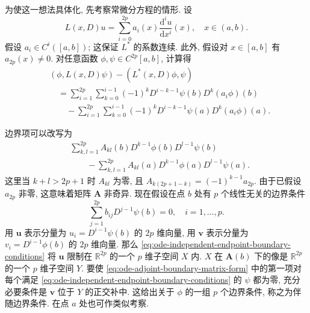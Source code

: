 为使这一想法具体化, 先考察常微分方程的情形. 设
\begin{equation}\label{eq:even-order-ordinary-differential-operator}
L(x,D)u=\sum_{i=0}^{2p}a_i(x)\dfrac{\mathrm{d}^iu}{\mathrm{d}x^i}(x),\quad x\in(a,b).
\end{equation}
假设 $a_i\in C^i([a,b])$; 这保证 $L^*$ 的系数连续. 此外, 假设对 $x\in[a,b]$ 有 $a_{2p}(x)\ne0$. 对任意函数 $\phi,\psi\in C^{2p}[a,b]$, 计算得
\begin{equation}\label{eq:ode-formal-adjoint-boundary-expansion}
\begin{aligned}
&(\phi,L(x,D)\psi)-(L^*(x,D)\phi,\psi)\\
&\quad=\sum_{i=1}^{2p}\sum_{k=0}^{i-1}(-1)^kD^{i-k-1}\psi(b)D^k(a_i\phi)(b)\\
&\qquad-\sum_{i=1}^{2p}\sum_{k=0}^{i-1}(-1)^kD^{i-k-1}\psi(a)D^k(a_i\phi)(a).
\end{aligned}
\end{equation}


边界项可以改写为
\begin{equation}\label{eq:ode-adjoint-boundary-matrix-form}
\begin{aligned}
&\sum_{k,l=1}^{2p}A_{kl}(b)D^{k-1}\phi(b)D^{l-1}\psi(b)\\
&\qquad-\sum_{k,l=1}^{2p}A_{kl}(a)D^{k-1}\phi(a)D^{l-1}\psi(a).
\end{aligned}
\end{equation}
这里当 $k+l>2p+1$ 时 $A_{kl}$ 为零, 且 $A_{k(2p+1-k)}=(-1)^{k-1}a_{2p}$. 由于已假设 $a_{2p}$ 非零, 这意味着矩阵 $\bm{A}$ 非奇异. 现在假设在点 $b$ 处有 $p$ 个线性无关的边界条件
\begin{equation}\label{eq:ode-independent-endpoint-boundary-conditions}
\sum_{j=1}^{2p}b_{ij}D^{j-1}\psi(b)=0,\quad i=1,\ldots,p.
\end{equation}
用 $\bm{u}$ 表示分量为 $u_i=D^{i-1}\psi(b)$ 的 $2p$ 维向量, 用 $\bm{v}$ 表示分量为 $v_i=D^{i-1}\phi(b)$ 的 $2p$ 维向量. 那么 \eqref{eq:ode-independent-endpoint-boundary-conditions} 将 $\bm{u}$ 限制在 $\mathbb{R}^{2p}$ 的一个 $p$ 维子空间 $X$ 内. $X$ 在 $\bm{A}(b)$ 下的像是 $\mathbb{R}^{2p}$ 的一个 $p$ 维子空间 $Y$. 要使 \eqref{eq:ode-adjoint-boundary-matrix-form} 中的第一项对每个满足 \eqref{eq:ode-independent-endpoint-boundary-conditions} 的 $\psi$ 都为零, 充分必要条件是 $\bm{v}$ 位于 $Y$ 的正交补中. 这给出关于 $\phi$ 的一组 $p$ 个边界条件, 称之为伴随边界条件. 在点 $a$ 处也可作类似考察.


